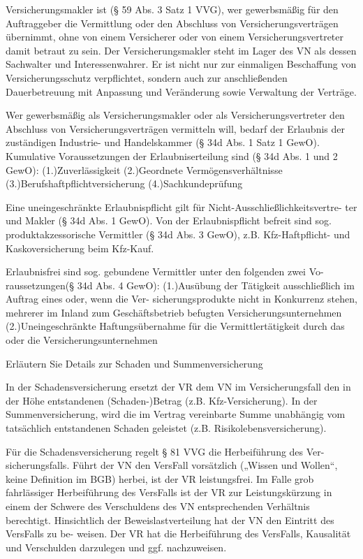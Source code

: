 Versicherungsmakler ist (§ 59 Abs. 3 Satz 1 VVG), wer
gewerbsmäßig für den Auftraggeber die Vermittlung oder den Abschluss von Versicherungsverträgen übernimmt, 
ohne von einem Versicherer oder von einem Versicherungsvertreter damit betraut zu sein. 
Der Versicherungsmakler steht im Lager des VN als dessen Sachwalter und Interessenwahrer. 
Er ist nicht nur zur einmaligen Beschaffung von Versicherungsschutz verpflichtet, 
sondern auch zur anschließenden Dauerbetreuung mit Anpassung und Veränderung sowie Verwaltung der
Verträge.

Wer gewerbsmäßig als Versicherungsmakler oder als Versicherungsvertreter den
Abschluss von Versicherungsverträgen vermitteln will, bedarf der Erlaubnis der
zuständigen Industrie- und Handelskammer (§ 34d Abs. 1 Satz 1 GewO).
Kumulative Voraussetzungen der Erlaubniserteilung sind (§ 34d Abs. 1 und 2
GewO):
(1.)Zuverlässigkeit
(2.)Geordnete Vermögensverhältnisse
(3.)Berufshaftpflichtversicherung
(4.)Sachkundeprüfung

Eine uneingeschränkte Erlaubnispflicht gilt für Nicht-Ausschließlichkeitsvertre-
ter und Makler (§ 34d Abs. 1 GewO). Von der Erlaubnispflicht befreit sind sog.
produktakzessorische Vermittler (§ 34d Abs. 3 GewO), z.B. Kfz-Haftpflicht- und
Kaskoversicherung beim Kfz-Kauf.

Erlaubnisfrei sind sog. gebundene Vermittler unter den folgenden zwei Vo-
raussetzungen(§ 34d Abs. 4 GewO):
(1.)Ausübung der Tätigkeit ausschließlich im Auftrag eines oder, wenn die Ver-
sicherungsprodukte nicht in Konkurrenz stehen, mehrerer im Inland zum
Geschäftsbetrieb befugten Versicherungsunternehmen
(2.)Uneingeschränkte Haftungsübernahme für die Vermittlertätigkeit durch das
oder die Versicherungsunternehmen


Erläutern Sie Details zur Schaden und Summenversicherung 

In der Schadensversicherung ersetzt der VR dem VN im Versicherungsfall den in
der Höhe entstandenen (Schaden-)Betrag (z.B. Kfz-Versicherung). 
In der Summenversicherung, wird die im Vertrag vereinbarte Summe unabhängig
vom tatsächlich entstandenen Schaden geleistet (z.B. Risikolebensversicherung).

Für die Schadensversicherung regelt § 81 VVG die Herbeiführung des Ver-
sicherungsfalls. Führt der VN den VersFall vorsätzlich („Wissen und Wollen“,
keine Definition im BGB) herbei, ist der VR leistungsfrei.
Im Falle grob fahrlässiger Herbeiführung des VersFalls ist der VR zur Leistungskürzung in einem der Schwere
des Verschuldens des VN entsprechenden Verhältnis berechtigt.
Hinsichtlich der Beweislastverteilung hat der VN den Eintritt des VersFalls zu be-
weisen. Der VR hat die Herbeiführung des VersFalls, Kausalität und Verschulden
darzulegen und ggf. nachzuweisen.


